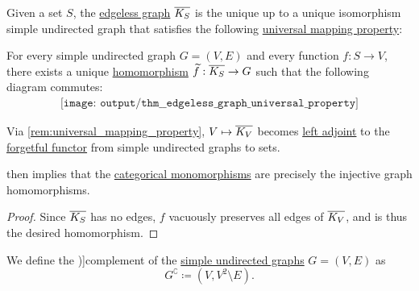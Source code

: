 \begin{theorem}\label{thm:edgeless_graph_universal_property}
  Given a set \( S \), the \hyperref[def:edgeless_graph]{edgeless graph} \( \oline{K_S} \) is the unique up to a unique isomorphism simple undirected graph that satisfies the following \hyperref[rem:universal_mapping_property]{universal mapping property}:
  \begin{displayquote}
    For every simple undirected graph \( G = (V, E) \) and every function \( f: S \to V \), there exists a unique \hyperref[def:undirected_graph/homomorphism]{homomorphism} \( \widetilde{f}: \oline{K_S} \to G \) such that the following diagram commutes:
    \begin{equation}\label{eq:thm:edgeless_graph_universal_property/diagram}
      \begin{aligned}
        \texttt{[image: output/thm\_\_edgeless\_graph\_universal\_property]}
      \end{aligned}
    \end{equation}
  \end{displayquote}
\end{theorem}
\begin{comments}
  \item Via \cref{rem:universal_mapping_property}, \( V \mapsto \oline{K_V} \) becomes \hyperref[def:category_adjunction]{left adjoint} to the \hyperref[def:concrete_category]{forgetful functor} from simple undirected graphs to sets.

   then implies that the \hyperref[def:morphism_invertibility/left_cancellative]{categorical monomorphisms} are precisely the injective graph homomorphisms.
\end{comments}
\begin{proof}
  Since \( \oline{K_S} \) has no edges, \( f \) vacuously preserves all edges of \( \oline{K_V} \), and is thus the desired homomorphism.
\end{proof}

\begin{definition}\label{def:graph_complement}
  We define the \term[ru=дополнение (\cite[15]{ЕмеличевИПр1990ТеорияГрафов})]{complement} of the \hyperref[def:undirected_graph]{simple undirected graphs} \( G = (V, E) \) as
  \begin{equation*}
     G^{\complement} \coloneqq (V, V^2 \setminus E).
  \end{equation*}
\end{definition}

